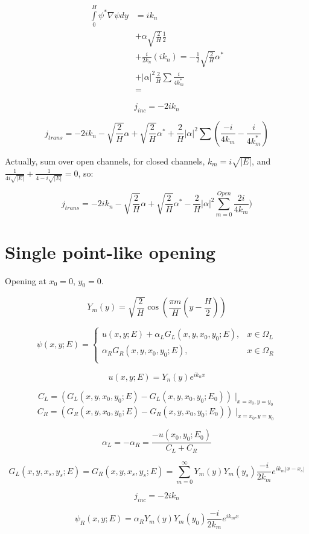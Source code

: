 \documentclass[12pt, a4paper]{article}
\begin{document}
\begin{align*}
\int\limits_{0}^H \psi^* \nabla \psi dy &=
   i k_n \\
&+ \alpha \sqrt{\frac{2}{H}} \frac{1}{2} \\
&+ \frac{i}{2 k_n} (i k_n) = -\frac{1}{2} \sqrt{\frac{2}{H}} \alpha^* \\
&+ |\alpha|^2 \frac{2}{H} \sum \frac{i}{4 k_m^*} \\
&= %
\end{align*}

$$j_{inc} = - 2 i k_n $$

$$j_{trans} = - 2 i k_n - \sqrt{\frac{2}{H}} \alpha + \sqrt{\frac{2}{H}} \alpha^* + \frac{2}{H}|\alpha|^2 \sum (\frac{-i}{4 k_m} - \frac{i}{4 k_m^*})$$

Actually, sum over open channels, for closed channels, $k_m = i \sqrt{|E|}$, and $\frac{1}{4 i \sqrt{|E|}} + \frac{1}{4 -i \sqrt{|E|}} = 0$, so:

$$j_{trans} = -2 i k_n - \sqrt{\frac{2}{H}} \alpha + \sqrt{\frac{2}{H}} \alpha^* - \frac  {2}{H}|\alpha|^2 \sum_{m = 0}^{Open} \frac{2i}{4 k_m})$$

\section{Single point-like opening}
Opening at $x_0 = 0$, $y_0 = 0$.

$$Y_m(y) = \sqrt{\frac{2}{H}} \cos(\frac{\pi m}{H} (y - \frac{H}{2}))$$

$$\psi(x, y; E) =
\begin{cases}
u(x, y; E) + \alpha_L G_L(x, y, x_0, y_0; E), & x \in \Omega_L \\
\alpha_R G_R(x, y, x_0, y_0; E), & x \in \Omega_R \\
\end{cases}$$

$$u(x, y; E) = Y_n(y) e^{i k_n x}$$

$$C_L = (G_L(x, y, x_0, y_0; E) - G_L(x, y, x_0, y_0; E_0))\mid_{x = x_0, y = y_0}$$
$$C_R = (G_R(x, y, x_0, y_0; E) - G_R(x, y, x_0, y_0; E_0))\mid_{x = x_0, y = y_0}$$

$$\alpha_L = -\alpha_R = \frac{-u(x_0, y_0; E_0)}{C_L + C_R}$$

$$G_L(x, y, x_s, y_s; E) = G_R(x, y, x_s, y_s; E) = \sum\limits_{m = 0}^\infty Y_m(y) Y_m(y_s) \frac{-i}{2 k_m} e^{i k_m |x - x_s|}$$

$$j_{inc} = -2 i k_n$$


$$\psi_R(x, y; E) = \alpha_R Y_m(y) Y_m(y_0) \frac{-i}{2 k_m} e^{i k_m x}$$
\end{document}

